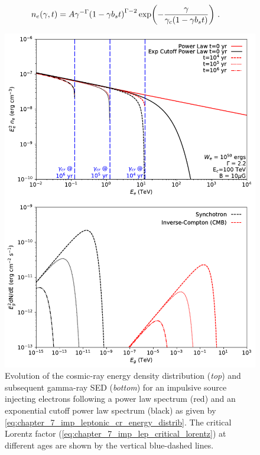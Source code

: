 \begin{equation}
    \begin{aligned}
    n_e\qty(\gamma,t)&=A\gamma^{-\Gamma}\qty(1-\gamma b_s t)^{\Gamma-2}\exp(-\frac{\gamma}{\gamma_c\qty(1-\gamma b_st)})\text{ .}
    \end{aligned} \label{eq:chapter_7_imp_leptonic_cr_energy_distrib}
\end{equation}
\begin{figure}[hbtp]
	\centering
	\includegraphics[width=1.0\textwidth]{07_Particle_Evolution/Images/evolution/impulsive_electron_total_spectrum.pdf}
	\caption{Evolution of the cosmic-ray energy density distribution (\textit{top}) and subsequent gamma-ray SED (\textit{bottom}) for an impulsive source injecting electrons following a power law spectrum (red) and an exponential cutoff power law spectrum (black) as given by \autoref{eq:chapter_7_imp_leptonic_cr_energy_distrib}. The critical Lorentz factor (\autoref{eq:chapter_7_imp_lep_critical_lorentz}) at different ages are shown by the vertical blue-dashed lines.}
	\label{fig:chapter_7_impulsive_lepton_cr_spectrum}
\end{figure}
